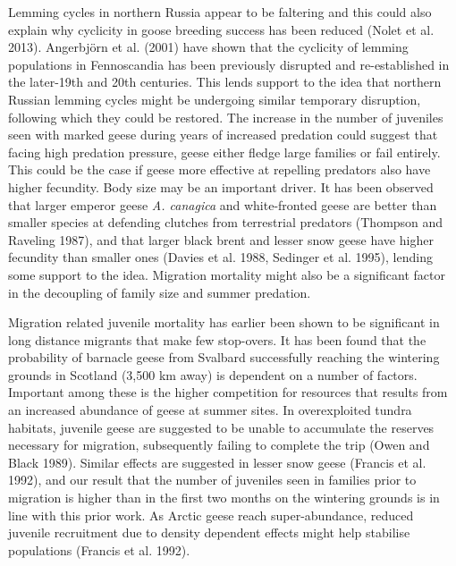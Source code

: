 \documentclass[10pt,twocolumn]{paper}
\begin{document}
Lemming cycles in northern Russia appear to be faltering and this could
also explain why cyclicity in goose breeding success has been reduced
(Nolet et al. 2013). Angerbjörn et al. (2001) have shown that the
cyclicity of lemming populations in Fennoscandia has been previously
disrupted and re-established in the later-19th and 20th centuries. This
lends support to the idea that northern Russian lemming cycles might be
undergoing similar temporary disruption, following which they could be
restored. The increase in the number of juveniles seen with marked geese
during years of increased predation could suggest that facing high
predation pressure, geese either fledge large families or fail entirely.
This could be the case if geese more effective at repelling predators
also have higher fecundity. Body size may be an important driver. It has
been observed that larger emperor geese \emph{A. canagica} and
white-fronted geese are better than smaller species at defending
clutches from terrestrial predators (Thompson and Raveling 1987), and
that larger black brent and lesser snow geese have higher fecundity than
smaller ones (Davies et al. 1988, Sedinger et al. 1995), lending some
support to the idea. Migration mortality might also be a significant
factor in the decoupling of family size and summer predation.

Migration related juvenile mortality has earlier been shown to be
significant in long distance migrants that make few stop-overs. It has
been found that the probability of barnacle geese from Svalbard
successfully reaching the wintering grounds in Scotland (3,500 km away)
is dependent on a number of factors. Important among these is the higher
competition for resources that results from an increased abundance of
geese at summer sites. In overexploited tundra habitats, juvenile geese
are suggested to be unable to accumulate the reserves necessary for
migration, subsequently failing to complete the trip (Owen and Black
1989). Similar effects are suggested in lesser snow geese (Francis et
al. 1992), and our result that the number of juveniles seen in families
prior to migration is higher than in the first two months on the
wintering grounds is in line with this prior work. As Arctic geese reach
super-abundance, reduced juvenile recruitment due to density dependent
effects might help stabilise populations (Francis et al. 1992).
\end{document}
